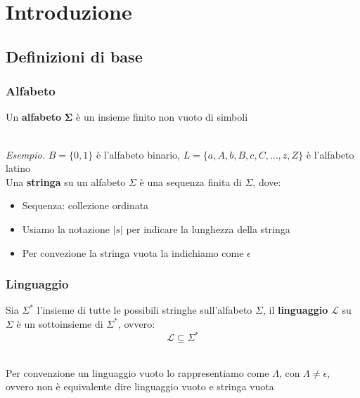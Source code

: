 \chapter{Introduzione}
\section{Definizioni di base}

\subsection{Alfabeto} \label{alfabeto}
\colorbox{SALZO}{\parbox{\dimexpr\linewidth-2\fboxsep}{\begin{definition}
   Un \textbf{alfabeto} $\bm{\Sigma}$ è un insieme finito non vuoto di simboli
\end{definition}}}\smallskip\\
\textit{Esempio.} $B = \{ 0,1 \}$ è l'alfabeto binario, $L = \{ a,A,b,B,c,C,\dots, z,Z  \}$ è l'alfabeto latino \smallskip\\
Una \textbf{stringa} su un alfabeto $\Sigma$ è una sequenza finita di $\Sigma$, dove:
\begin{itemize}
    \item Sequenza: collezione ordinata
    \item Usiamo la notazione $|s|$ per indicare la lunghezza della stringa
    \item Per convezione la stringa vuota la indichiamo come $\epsilon$
\end{itemize}


\subsection{Linguaggio}
\colorbox{SALZO}{\parbox{\dimexpr\linewidth-2\fboxsep}{\begin{definition}
   Sia $\Sigma^*$ l'insieme di tutte le possibili stringhe sull'alfabeto $\Sigma$, il \textbf{linguaggio} $\bm{\mathcal{L}}$ su $\Sigma$ è un sottoinsieme di $\Sigma^*$, ovvero:
   \[  \mathcal{L} \subseteq \Sigma^*  \]
\end{definition}}}\smallskip\\
Per convenzione un linguaggio vuoto lo rappresentiamo come $\Lambda$, con $\Lambda \neq \epsilon$, ovvero non è equivalente dire linguaggio vuoto e stringa vuota

